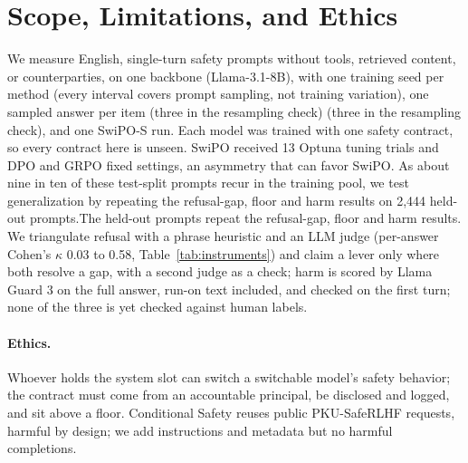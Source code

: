 \section{Scope, Limitations, and Ethics}

We measure English, single-turn safety prompts without tools, retrieved content, or counterparties, on one backbone (Llama-3.1-8B), with one training seed per method (every interval covers prompt sampling, not training variation), one sampled answer per item\ifvenueRobust{} (three in the resampling check)\fi\ifvenueBench{} (three in the resampling check)\fi, and one \mbox{SwiPO-S} run. Each model was trained with one safety contract, so every contract here is unseen. SwiPO received 13 Optuna tuning trials and DPO and GRPO fixed settings, an asymmetry that can favor SwiPO. \ifvenueLoyal As about nine in ten of these test-split prompts recur in the training pool, we test generalization by repeating the refusal-gap, floor and harm results on 2,444 held-out prompts.\else The held-out prompts repeat the refusal-gap, floor and harm results.\fi{} We triangulate refusal with a phrase heuristic and an LLM judge (per-answer Cohen's $\kappa$ 0.03 to 0.58, Table~\ref{tab:instruments}) and claim a lever only where both resolve a gap, with a second judge as a check; harm is scored by Llama Guard 3 on the full answer, run-on text included, and checked on the first turn; none of the three is yet checked against human labels.

\paragraph{Ethics.} \ifvenueBench Whoever holds the system slot can switch a switchable model's safety behavior; the contract must come from an accountable principal, be disclosed and logged, and sit above a floor. \fi Conditional Safety reuses public \mbox{PKU-SafeRLHF} requests, harmful by design; we add instructions and metadata but no harmful completions.
